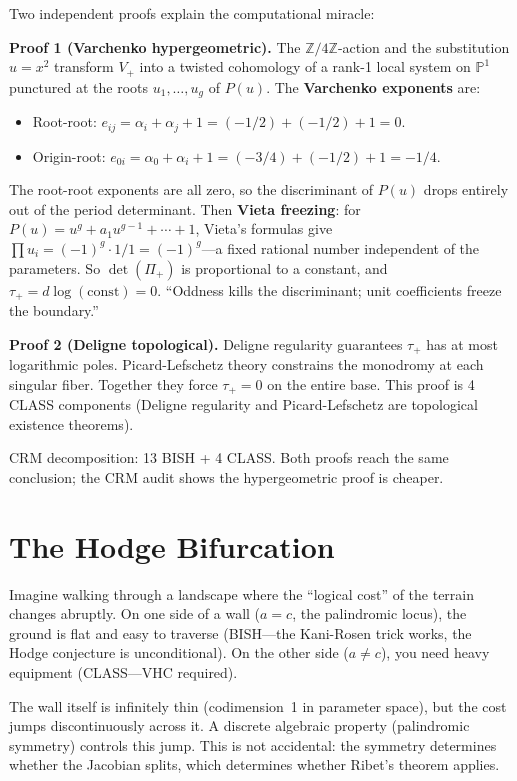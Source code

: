 \documentclass[11pt,twoside,openany]{report}
\theoremstyle{remark}
\newcommand{\BISH}{\textsf{BISH}}
\newcommand{\CLASS}{\textsf{CLASS}}
\begin{document}
Two independent proofs explain the computational miracle:

\textbf{Proof 1 (Varchenko hypergeometric).} The $\mathbb{Z}/4\mathbb{Z}$-action and the substitution $u = x^2$ transform $V_+$ into a twisted cohomology of a rank-1 local system on $\mathbb{P}^1$ punctured at the roots $u_1, \ldots, u_g$ of $P(u)$. The \textbf{Varchenko exponents} are:
\begin{itemize}
  \item Root-root: $e_{ij} = \alpha_i + \alpha_j + 1 = (-1/2) + (-1/2) + 1 = 0$.
  \item Origin-root: $e_{0i} = \alpha_0 + \alpha_i + 1 = (-3/4) + (-1/2) + 1 = -1/4$.
\end{itemize}
The root-root exponents are all zero, so the discriminant of $P(u)$ drops entirely out of the period determinant. Then \textbf{Vieta freezing}: for $P(u) = u^g + a_1 u^{g-1} + \cdots + 1$, Vieta's formulas give $\prod u_i = (-1)^g \cdot 1/1 = (-1)^g$---a fixed rational number independent of the parameters. So $\det(\Pi_+)$ is proportional to a constant, and $\tau_+ = d\log(\text{const}) = 0$. ``Oddness kills the discriminant; unit coefficients freeze the boundary.''

\textbf{Proof 2 (Deligne topological).} Deligne regularity guarantees $\tau_+$ has at most logarithmic poles. Picard-Lefschetz theory constrains the monodromy at each singular fiber. Together they force $\tau_+ = 0$ on the entire base. This proof is 4 \CLASS{} components (Deligne regularity and Picard-Lefschetz are topological existence theorems).

CRM decomposition: 13 \BISH{} + 4 \CLASS{}. Both proofs reach the same conclusion; the CRM audit shows the hypergeometric proof is cheaper.


\section{The Hodge Bifurcation}

\begin{analogybox}
Imagine walking through a landscape where the ``logical cost'' of the terrain changes abruptly. On one side of a wall ($a = c$, the palindromic locus), the ground is flat and easy to traverse (\BISH{}---the Kani-Rosen trick works, the Hodge conjecture is unconditional). On the other side ($a \neq c$), you need heavy equipment (\CLASS{}---VHC required).

The wall itself is infinitely thin (codimension~1 in parameter space), but the cost jumps discontinuously across it. A discrete algebraic property (palindromic symmetry) controls this jump. This is not accidental: the symmetry determines whether the Jacobian splits, which determines whether Ribet's theorem applies.
\end{analogybox}
\end{document}
